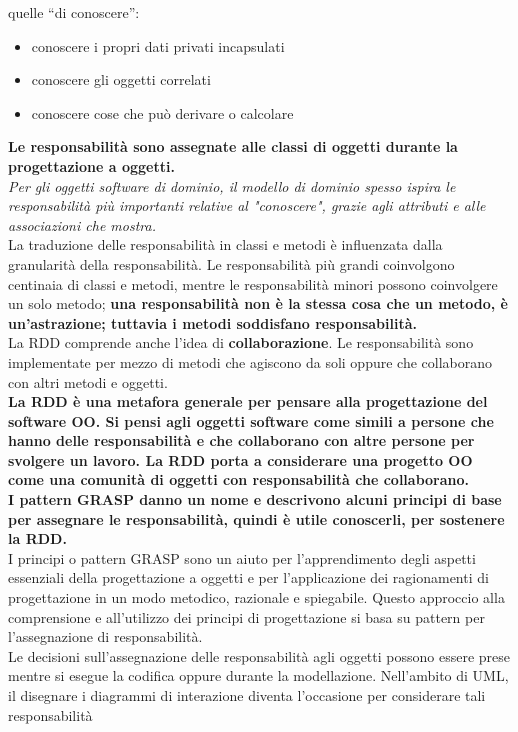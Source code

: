\documentclass[a4paper,12pt, oneside]{book}
\begin{document}
quelle ``di conoscere'':
\begin{itemize}
\item conoscere i propri dati privati incapsulati
\item conoscere gli oggetti correlati
\item conoscere cose che può derivare o calcolare
\end{itemize}
\textbf{Le responsabilità sono assegnate alle classi di oggetti durante la progettazione a oggetti.}\\
\textit{Per gli oggetti software di dominio, il modello di dominio spesso ispira le
  responsabilità più importanti relative al "conoscere", grazie agli attributi e alle associazioni che mostra.}\\
La traduzione delle responsabilità in classi e metodi è influenzata dalla granularità della
responsabilità. Le responsabilità più grandi coinvolgono centinaia di classi e metodi,
mentre le responsabilità minori possono coinvolgere un solo metodo; \textbf{una responsabilità non è la stessa cosa che un metodo, è un'astrazione; tuttavia i metodi
  soddisfano responsabilità.}\\
La RDD comprende anche l'idea di\textbf{ collaborazione}. Le responsabilità sono implementate per mezzo di metodi che agiscono da
soli oppure che collaborano con altri metodi e oggetti.\\
\textbf{La RDD è una metafora generale per pensare alla progettazione del software OO. Si
pensi agli oggetti software come simili a persone che hanno delle responsabilità e che
collaborano con altre persone per svolgere un lavoro. La RDD porta a considerare una
progetto OO come una comunità di oggetti con responsabilità che collaborano.}\\
\textbf{I pattern GRASP danno un nome e descrivono alcuni principi di base per
  assegnare le responsabilità, quindi è utile conoscerli, per sostenere la RDD.}\\
I principi o pattern GRASP sono un aiuto per l'apprendimento degli aspetti
essenziali della progettazione a oggetti e per l'applicazione dei ragionamenti di
progettazione in un modo metodico, razionale e spiegabile. Questo approccio alla
comprensione e all'utilizzo dei principi di progettazione si basa su pattern per l'assegnazione di responsabilità.\\
Le decisioni sull'assegnazione delle responsabilità agli oggetti possono essere prese
mentre si esegue la codifica oppure durante la modellazione. Nell'ambito di UML,
il disegnare i diagrammi di interazione diventa l'occasione per considerare tali responsabilità
\end{document}
